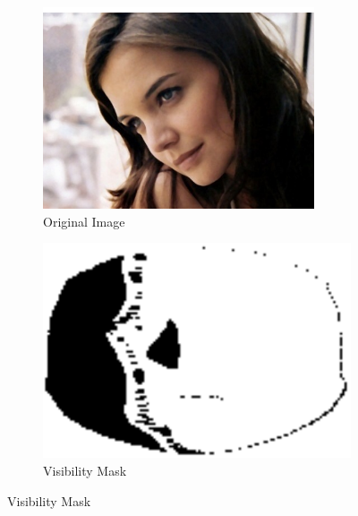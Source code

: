 \begin{figure}[t]
    \centering
    \hspace*{\fill}
    \begin{subfigure}[b]{0.2\textheight}
        \centering
        \includegraphics[width=\textwidth]{face_flow/images/contour_snapping/posed_head}
        \caption{Original Image~\cite{sagonas2013300}}\label{subfig:face_flow_occluded_input}
    \end{subfigure} \hfill
    \begin{subfigure}[b]{0.2\textheight}
        \centering
        \includegraphics[width=\textwidth]{face_flow/images/contour_snapping/posed_visibility_mask}
        \caption{Visibility Mask}\label{subfig:face_flow_occluded_vis_mask}
    \end{subfigure} \hfill

\end{figure}
